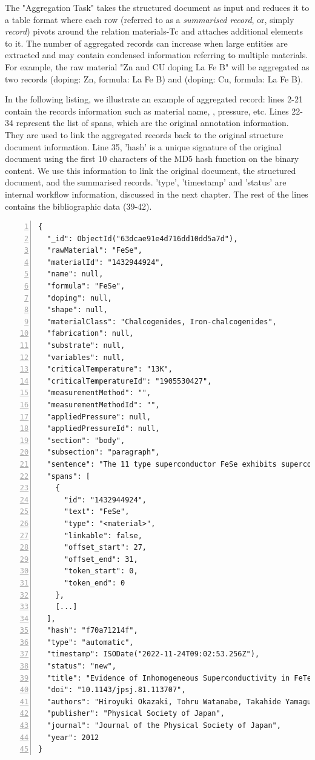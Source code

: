 The "Aggregation Task" takes the structured document as input and reduces it to a table format where each row (referred to as a \textit{summarised record}, or, simply \textit{record}) pivots around the relation materials-Tc and attaches additional elements to it. 
The number of aggregated records can increase when large entities are extracted and may contain condensed information referring to multiple materials. 
For example, the raw material "Zn and CU doping La Fe B" will be aggregated as two records (doping: Zn, formula: La Fe B) and (doping: Cu, formula: La Fe B). 

In the following listing, we illustrate an example of aggregated record: lines 2-21 contain the records information such as material name, \tc, pressure, etc. Lines 22-34 represent the list of spans, which are the original annotation information. They are used to link the aggregated records back to the original structure document information. 
Line 35, 'hash' is a unique signature of the original document using the first 10 characters of the MD5 hash function on the binary content. We use this information to link the original document, the structured document, and the summarised records.
'type', 'timestamp' and 'status' are internal workflow information, discussed in the next chapter. 
The rest of the lines contains the bibliographic data (39-42).

\begin{lstlisting}[numbers=left,numbersep=5pt,caption=Example of record related to the FeSe material after the aggregation.]
{
  "_id": ObjectId("63dcae91e4d716dd10dd5a7d"),
  "rawMaterial": "FeSe",
  "materialId": "1432944924",
  "name": null,
  "formula": "FeSe",
  "doping": null,
  "shape": null,
  "materialClass": "Chalcogenides, Iron-chalcogenides",
  "fabrication": null,
  "substrate": null,
  "variables": null,
  "criticalTemperature": "13K",
  "criticalTemperatureId": "1905530427",
  "measurementMethod": "",
  "measurementMethodId": "",
  "appliedPressure": null,
  "appliedPressureId": null,
  "section": "body",
  "subsection": "paragraph",
  "sentence": "The 11 type superconductor FeSe exhibits superconductivity with T c = 13K [2] and its T c reaches 37K under high pressure (4-6 GPa) [3,4].",
  "spans": [
    {
      "id": "1432944924",
      "text": "FeSe",
      "type": "<material>",
      "linkable": false,
      "offset_start": 27,
      "offset_end": 31,
      "token_start": 0,
      "token_end": 0
    },
    [...]
  ],
  "hash": "f70a71214f",
  "type": "automatic",
  "timestamp": ISODate("2022-11-24T09:02:53.256Z"),
  "status": "new",
  "title": "Evidence of Inhomogeneous Superconductivity in FeTe1-xSexby Scotch-Tape Method",
  "doi": "10.1143/jpsj.81.113707",
  "authors": "Hiroyuki Okazaki, Tohru Watanabe, Takahide Yamaguchi, Yasuna Kawasaki, Keita Deguchi, Satoshi Demura, Toshinori Ozaki, Saleem. J. Denholme, Yoshikazu Mizuguchi, Hiroyuki Takeya, Yoshihiko Takano",
  "publisher": "Physical Society of Japan",
  "journal": "Journal of the Physical Society of Japan",
  "year": 2012
}
\end{lstlisting}





